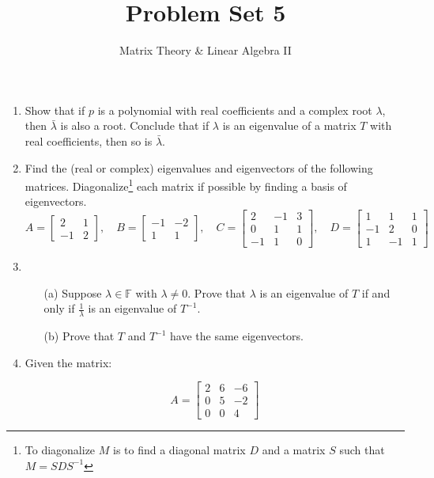\documentclass[a4paper,11pt]{article}
\title{Problem Set 5}
\author{Matrix Theory \& Linear Algebra II}
\date{}
\theoremstyle{definition}
\begin{document}
\maketitle
\thispagestyle{empty}

\noindent
\begin{enumerate}[(1)]
    \item
    Show that if $p$ is a polynomial with real coefficients and a complex root $\lambda$, then $\bar\lambda$ is also a root.
    Conclude that if $\lambda$ is an eigenvalue of a matrix $T$ with real coefficients, then so is $\bar\lambda$.

    \item
    Find the (real or complex) eigenvalues and eigenvectors of the following matrices. Diagonalize\footnote{To diagonalize $M$ is to find a diagonal matrix $D$ and a matrix $S$ such that $M = SDS^{-1}$} each matrix if possible by finding a basis of eigenvectors.
\[
A = \begin{bmatrix} 2 & 1 \\ -1 & 2 \end{bmatrix}, \quad
B = \begin{bmatrix} -1 & -2 \\ 1 & 1 \end{bmatrix}, \quad
C = \begin{bmatrix} 2 & -1 & 3 \\ 0 & 1 & 1 \\ -1 & 1 & 0 \end{bmatrix}, \quad
D = \begin{bmatrix} 1 & 1 & 1 \\ -1 & 2 & 0 \\ 1 & -1 & 1 \end{bmatrix}
\]

\item 

\begin{itemize}
    \item[(a)] Suppose \( \lambda \in \mathbb{F} \) with \( \lambda \neq 0 \). Prove that \( \lambda \) is an eigenvalue of \( T \) if and only if \( \frac{1}{\lambda} \) is an eigenvalue of \( T^{-1} \).
    \item[(b)] Prove that \( T \) and \( T^{-1} \) have the same eigenvectors.
\end{itemize}

\item 
Given the matrix:


\[
A = \begin{bmatrix} 
2 & 6 & -6 \\ 
0 & 5 & -2 \\ 
0 & 0 & 4 
\end{bmatrix}
\]


\end{enumerate}
\end{document}
